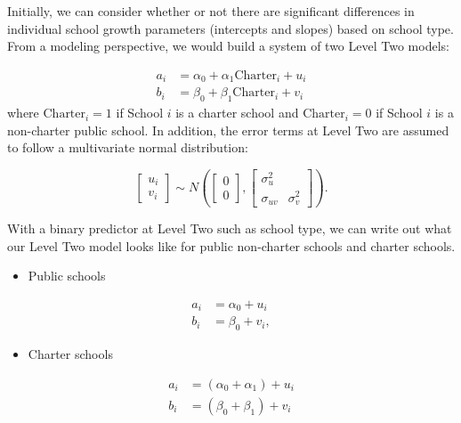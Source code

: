 \documentclass[
]{krantz}
\providecommand{\tightlist}{%
  \setlength{\itemsep}{0pt}\setlength{\parskip}{0pt}}
\begin{document}
Initially, we can consider whether or not there are significant differences in individual school growth parameters (intercepts and slopes) based on school type. From a modeling perspective, we would build a system of two Level Two models:

\begin{align*}
a_{i} & = \alpha_{0} + \alpha_{1}\textrm{Charter}_i + u_{i} \\
b_{i} & = \beta_{0} + \beta_{1}\textrm{Charter}_i + v_{i}
\end{align*}
where \(\textrm{Charter}_i=1\) if School \(i\) is a charter school and \(\textrm{Charter}_i=0\) if School \(i\) is a non-charter public school. In addition, the error terms at Level Two are assumed to follow a multivariate normal distribution:

\[ \left[ \begin{array}{c}
            u_{i} \\ v_{i}
          \end{array}  \right] \sim N \left( \left[
          \begin{array}{c}
            0 \\ 0
          \end{array} \right], \left[
          \begin{array}{cc}
            \sigma_{u}^{2} & \\
            \sigma_{uv} & \sigma_{v}^{2}
          \end{array} \right] \right) . \]

With a binary predictor at Level Two such as school type, we can write out what our Level Two model looks like for public non-charter schools and charter schools.

\begin{itemize}
\tightlist
\item
  Public schools
\end{itemize}

\begin{align*}
a_{i} & = \alpha_{0} + u_{i}\\
b_{i} & = \beta_{0} + v_{i},
\end{align*}

\begin{itemize}
\tightlist
\item
  Charter schools
\end{itemize}

\begin{align*}
a_{i} & = (\alpha_{0} + \alpha_{1}) + u_{i}\\
b_{i} & = (\beta_{0}+ \beta_{1}) + v_{i}
\end{align*}
\end{document}

